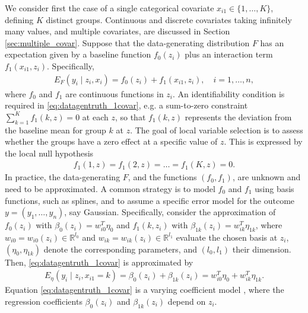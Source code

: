 We consider first the case of a single categorical covariate $x_{i1} \in \{1,\ldots,K\}$, defining $K$ distinct groups. 
 Continuous and discrete covariates taking infinitely many values, and multiple covariates, are discussed in Section \ref{sec:multiple_covar}. 
Suppose that the data-generating distribution $F$ has an expectation given by a baseline function $f_0(z_i)$ plus an interaction term $f_1(x_{i1}, z_i)$. 
Specifically,
\begin{align}
E_F(y_i \mid z_i, x_i) = f_0(z_i) + f_1(x_{i1}, z_i), \quad i=1,\ldots,n,
\label{eq:datagentruth_1covar}
\end{align}
where  $f_0$ and $f_1$ are  continuous functions in $z_i$.   An identifiability condition is required in \eqref{eq:datagentruth_1covar}, e.g. 
 a sum-to-zero constraint $\sum_{k=1}^K f_1(k,z)=0$ at each $z$,
so that 
$f_1(k,z)$ represents the deviation from the baseline mean for group $k$ at $z$.
The goal of local variable selection is to assess whether the groups have a zero effect at a specific value of $z$. This is expressed by the local null hypothesis
\begin{align}
f_1(1,z) = f_1(2,z)= \ldots = f_1(K,z)= 0.
\nonumber
\end{align}
In practice, the data-generating $F$, and the functions $(f_0,f_1)$, are unknown and need to be approximated. 
A common strategy is to model $f_0$ and $f_1$ using basis functions, such as splines, and to assume a specific error model for the outcome $y=(y_1,\ldots,y_n)$, say Gaussian.
Specifically, consider the approximation  of $f_0(z_i)$ with $\beta_0(z_i) = w_{i0}^T \eta_0$ and $f_1(k,z_i)$ with $\beta_{1k}(z_i) = w_{ik}^T \eta_{1k}$, where $w_{i0}=w_{i0}(z_i) \in \mathbb{R}^{l_0}$ and $w_{ik}=w_{ik}(z_i) \in \mathbb{R}^{l_1}$ evaluate the chosen basis at $z_i$, $(\eta_0, \eta_{1k})$ denote the corresponding parameters, and $(l_0,l_1)$ their dimension.
Then,  \eqref{eq:datagentruth_1covar} is approximated by
\begin{align}
E_\eta(y_i \mid z_i, x_{i1}=k)= \beta_0(z_i) + \beta_{1 k}(z_i)= w_{i0}^T \eta_0 + w_{i k}^T \eta_{1 k}.
\label{eq:vcmodel_1covar}
\end{align}
Equation \eqref{eq:datagentruth_1covar} is a varying coefficient model \citep{hastie:1993}, where the regression coefficients $\beta_0(z_i)$ and $\beta_{1k}(z_i)$ depend on $z_i$.

